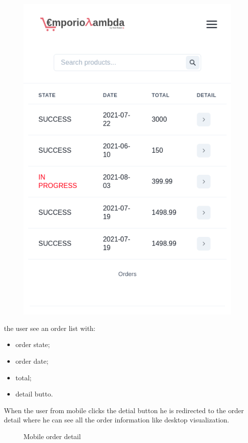\begin{itemize}
\begin{figure}[!ht]
              \includegraphics[scale=0.3]{../../../../Images/userManual/orderMobile.png}
              \centering
          \end{figure}
          the user see an order list with:
          \begin{itemize}
              \item order state;
              \item order date;
              \item total;
              \item detail butto.
          \end{itemize}
          When the user from mobile clicks the detial button he is redirected to the order detail where he can see all the order information like desktop visualization.
          \begin{figure}[!ht]
              \caption{Mobile order detail}

\end{figure}
\end{itemize}
